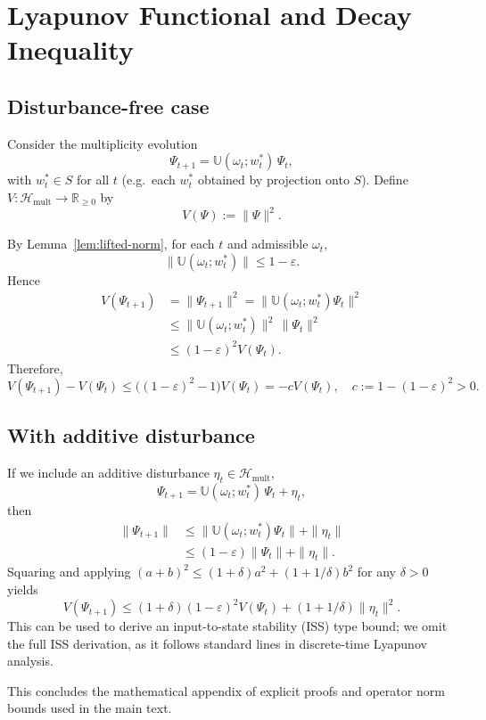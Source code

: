 \documentclass[11pt]{article}
\begin{document}
\section{Lyapunov Functional and Decay Inequality}

\subsection{Disturbance-free case}

Consider the multiplicity evolution
\[
\Psi_{t+1} = \mathbb U(\omega_t;w_t^\ast)\,\Psi_t,
\]
with $w_t^\ast\in S$ for all $t$ (e.g.\ each $w_t^\ast$ obtained by projection onto $S$). Define $V:\mathcal H_{\mathrm{mult}}\to\mathbb R_{\ge 0}$ by
\[
V(\Psi) := \|\Psi\|^2.
\]

By Lemma~\ref{lem:lifted-norm}, for each $t$ and admissible $\omega_t$,
\[
\|\mathbb U(\omega_t;w_t^\ast)\|
\le 1-\varepsilon.
\]
Hence
\begin{align*}
V(\Psi_{t+1})
&= \|\Psi_{t+1}\|^2
= \|\mathbb U(\omega_t;w_t^\ast)\Psi_t\|^2\\
&\le \|\mathbb U(\omega_t;w_t^\ast)\|^2 \,\|\Psi_t\|^2\\
&\le (1-\varepsilon)^2 V(\Psi_t).
\end{align*}
Therefore,
\begin{equation}
  V(\Psi_{t+1}) - V(\Psi_t)
  \le \bigl((1-\varepsilon)^2 - 1\bigr) V(\Psi_t)
  = -c V(\Psi_t),
  \quad c := 1-(1-\varepsilon)^2>0.
\end{equation}

\subsection{With additive disturbance}

If we include an additive disturbance $\eta_t\in\mathcal H_{\mathrm{mult}}$,
\[
\Psi_{t+1} = \mathbb U(\omega_t;w_t^\ast)\,\Psi_t + \eta_t,
\]
then
\begin{align*}
\|\Psi_{t+1}\|
&\le \|\mathbb U(\omega_t;w_t^\ast)\Psi_t\| + \|\eta_t\|\\
&\le (1-\varepsilon)\|\Psi_t\| + \|\eta_t\|.
\end{align*}
Squaring and applying $(a+b)^2\le (1+\delta)a^2 + (1+1/\delta)b^2$ for any $\delta>0$ yields
\[
V(\Psi_{t+1})
\le (1+\delta)(1-\varepsilon)^2 V(\Psi_t)
 + (1+1/\delta)\|\eta_t\|^2.
\]
This can be used to derive an input-to-state stability (ISS) type bound; we omit the full ISS derivation, as it follows standard lines in discrete-time Lyapunov analysis.

\bigskip

This concludes the mathematical appendix of explicit proofs and operator norm bounds used in the main text.


\nocite{*}


\end{document}
